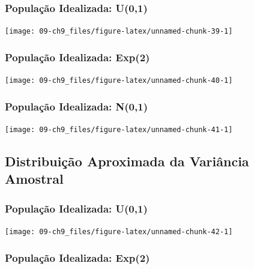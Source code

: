 \documentclass[
]{book}
\theoremstyle{definition}
\theoremstyle{definition}
\theoremstyle{definition}
\theoremstyle{remark}
\begin{document}
\hypertarget{populauxe7uxe3o-idealizada-u01-1}{%
\subsubsection*{População Idealizada: U(0,1)}\label{populauxe7uxe3o-idealizada-u01-1}}

\texttt{[image: 09-ch9\_files/figure-latex/unnamed-chunk-39-1]}

\hypertarget{populauxe7uxe3o-idealizada-exp2-1}{%
\subsubsection*{População Idealizada: Exp(2)}\label{populauxe7uxe3o-idealizada-exp2-1}}

\texttt{[image: 09-ch9\_files/figure-latex/unnamed-chunk-40-1]}

\hypertarget{populauxe7uxe3o-idealizada-n01-1}{%
\subsubsection*{População Idealizada: N(0,1)}\label{populauxe7uxe3o-idealizada-n01-1}}

\texttt{[image: 09-ch9\_files/figure-latex/unnamed-chunk-41-1]}

\hypertarget{distribuiuxe7uxe3o-aproximada-da-variuxe2ncia-amostral}{%
\subsection*{Distribuição Aproximada da Variância Amostral}\label{distribuiuxe7uxe3o-aproximada-da-variuxe2ncia-amostral}}

\hypertarget{populauxe7uxe3o-idealizada-u01-2}{%
\subsubsection*{População Idealizada: U(0,1)}\label{populauxe7uxe3o-idealizada-u01-2}}

\texttt{[image: 09-ch9\_files/figure-latex/unnamed-chunk-42-1]}

\hypertarget{populauxe7uxe3o-idealizada-exp2-2}{%
\subsubsection*{População Idealizada: Exp(2)}\label{populauxe7uxe3o-idealizada-exp2-2}}
\end{document}
